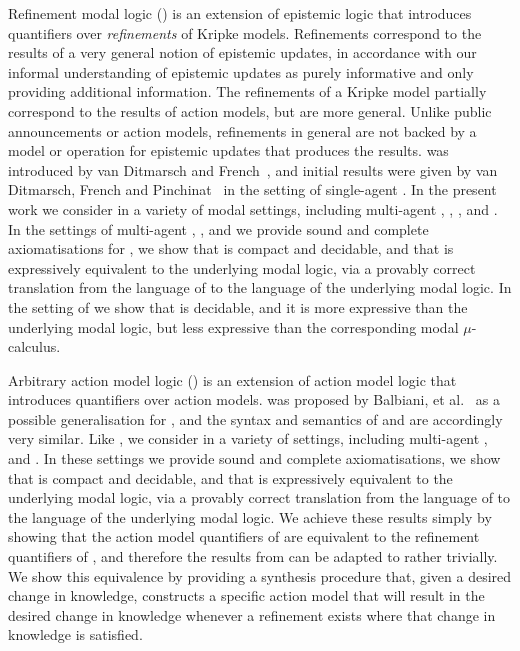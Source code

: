Refinement modal logic (\logicRml{}) is an extension of epistemic logic that introduces quantifiers over {\em refinements} of Kripke models.
Refinements correspond to the results of a very general notion of epistemic updates, in accordance with our informal understanding of epistemic updates as purely informative and only providing additional information.
The refinements of a Kripke model partially correspond to the results of action models, but are more general.
Unlike public announcements or action models, refinements in general are not backed by a model or operation for epistemic updates that produces the results.
\logicRml{} was introduced by van Ditmarsch and French~\cite{vanditmarsch:2009}, and initial results were given by van Ditmarsch, French and Pinchinat~\cite{vanditmarsch:2010} in the setting of single-agent \classK{}.
In the present work we consider \logicRml{} in a variety of modal settings, including multi-agent \classK{}, \classKF{}, \classKFF{}, \classKD{} and \classS{}.
In the settings of multi-agent \classK{}, \classKFF{}, \classKD{} and \classS{} we provide sound and complete axiomatisations for \logicRml{}, we show that \logicRml{} is compact and decidable, and that \logicRml{} is expressively equivalent to the underlying modal logic, via a provably correct translation from the language of \logicRml{} to the language of the underlying modal logic.
In the setting of \classKF{} we show that \logicRml{} is decidable, and it is more expressive than the underlying modal logic, but less expressive than the corresponding modal $\mu$-calculus.

Arbitrary action model logic (\logicAaml{}) is an extension of action model logic that introduces quantifiers over action models.
\logicAaml{} was proposed by Balbiani, et al.~\cite{balbiani:2007} as a possible generalisation for \logicApal{}, and the syntax and semantics of \logicAaml{} and \logicApal{} are accordingly very similar.
Like \logicRml{}, we consider \logicAaml{} in a variety of settings, including multi-agent \classK{}, \classKFF{} and \classS{}.
In these settings we provide sound and complete axiomatisations, we show that \logicAaml{} is compact and decidable, and that \logicAaml{} is expressively equivalent to the underlying modal logic, via a provably correct translation from the language of \logicAaml{} to the language of the underlying modal logic.
We achieve these results simply by showing that the action model quantifiers of \logicAaml{} are equivalent to the refinement quantifiers of \logicRml{}, and therefore the results from \logicRml{} can be adapted to \logicAaml{} rather trivially.
We show this equivalence by providing a synthesis procedure that, given a desired change in knowledge, constructs a specific action model that will result in the desired change in knowledge whenever a refinement exists where that change in knowledge is satisfied.

